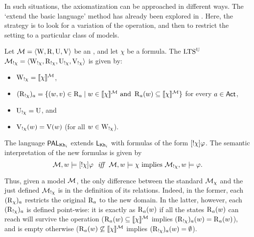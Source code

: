 In such situations, the axiomatization can be approached in different ways. The `extend the basic language' method has already been explored in \cite{Wang2016}. Here, the strategy is to look for a variation of the operation, and then to restrict the setting to a particular class of models.

\medskip

\begin{definition}\label{def:annupdate}\label{def:pakhsyntax}
Let $\mathcal{M} = \langle \operatorname{W}, \operatorname{R}, \operatorname{U}, \operatorname{V} \rangle$ be an \ults, and let $\chi$ be a formula. The $\textup{LTS$^\text{\textup{U}}$}$ $\mathcal{M}_{!\chi} = \langle \operatorname{W}_{!\chi}, \operatorname{R}_{!\chi}, \operatorname{U}_{!\chi}, \operatorname{V}_{!\chi} \rangle$ is given by:
\begin{itemize}
\item $\operatorname{W}_{!\chi} = \llbracket \chi \rrbracket^{\mathcal{M}}$,
\item $(\operatorname{R}_{!\chi})_a = \{ (w,v) \in \operatorname{R}_a \mid w \in \llbracket \chi \rrbracket^{\mathcal{M}} \text{ and } \operatorname{R}_a(w) \subseteq \llbracket \chi \rrbracket^{\mathcal{M}} \}$ for every $a \in {\rm \sf Act}$,
\item $\operatorname{U}_{!\chi} = \operatorname{U}$, and 
\item $\operatorname{V}_{!\chi}(w) = \operatorname{V}(w)$ (for all $w\in\operatorname{W}_{!\chi}$).
\end{itemize}
\smallskip
The language $\mathsf{PAL}_{{\sf Kh}_i}$ extends $\mathsf{L}_{{\sf Kh}_i}$ with formulas of the form $[!\chi]\varphi$. The semantic interpretation of the new formulas is given by
\[
	\modults,w \models \gann{\chi}\varphi \ \ \iff \ \ \modults,w \models \chi \mbox{ implies } \annmodelchi,w \models \varphi.
\]
\end{definition}

Thus, given a model $\mathcal{M}$, the only difference between the standard $\mathcal{M}_{\chi}$ and the just defined $\mathcal{M}_{!\chi}$ is in the definition of 
its relations. Indeed, in the former, each $(\operatorname{R}_\chi)_a$ restricts the original $\operatorname{R}_a$ to the new domain. In the latter, however, each $(\operatorname{R}_{!\chi})_a$ is defined point-wise: it is exactly as $\operatorname{R}_a(w)$ if all the states $\operatorname{R}_a(w)$ can reach will survive the operation ($\operatorname{R}_a(w) \subseteq \llbracket \chi \rrbracket^{\mathcal{M}}$ implies $(\operatorname{R}_{!\chi})_a(w) = \operatorname{R}_a(w)$), and is empty otherwise ($\operatorname{R}_a(w) \not \subseteq \llbracket \chi \rrbracket^{\mathcal{M}}$ implies $(\operatorname{R}_{!\chi})_a(w) = \emptyset$).

